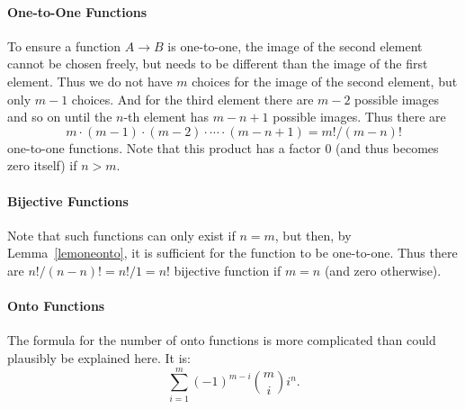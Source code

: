 \paragraph{One-to-One Functions}
To ensure a function $A\to B$ is one-to-one, the image of the second element cannot be chosen
freely, but needs to be different than the image of the first element. Thus we do not
have $m$ choices for the image of the second element, but only $m-1$ choices. And for the third element there are $m-2$
possible images and so on until the $n$-th element has $m-n+1$ possible images. Thus there are
\[
m\cdot (m-1)\cdot (m-2)\cdot \cdots\cdot (m-n+1)=m!/(m-n)!
\]
one-to-one functions. Note that this product has a factor $0$ (and thus becomes zero
itself) if $n>m$.

\paragraph{Bijective Functions}
Note that such functions can only exist if $n=m$, but then, by Lemma~\ref{lemoneonto},
it is sufficient for the function to be one-to-one. Thus there
are
$n!/(n-n)!=n!/1=n!$
bijective function if $m=n$ (and zero otherwise).

\paragraph{Onto Functions}
The formula for the number of onto functions is more complicated than could plausibly be
explained here. It is:
\[
\sum_{i=1}^m (-1)^{m-i}{m\choose i}i^n.
\]


